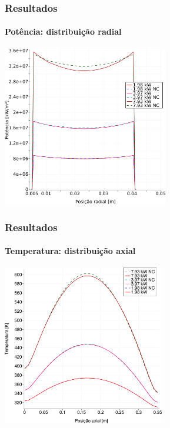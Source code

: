 \documentclass[svgnames,smaller,table]{beamer}
\begin{document}
\begin{frame}
  \frametitle{Resultados}
  \framesubtitle{Potência: distribuição radial}
  \centering\includegraphics[width=\textwidth, height=7.0cm]{../figuras/Q_all_x_square_port.png}
  \label{fig:keff50}
\end{frame}

\begin{frame}
  \frametitle{Resultados}
  \framesubtitle{Temperatura: distribuição axial}
  \centering\includegraphics[width=\textwidth, height=7.0cm]{../figuras/T_z_all_square_port.png}
  \label{fig:keff50}
\end{frame}
\end{document}
